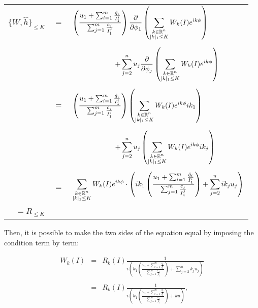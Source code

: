 \begin{longtable}{rcl}
$\{W,\hat{h}\}_{\leq K}$ & $=$ & $\displaystyle
 \left(\frac{u_1 + \sum_{i = 1}^{m}\frac{\hat{q}_i}{I_1^i}}{\sum_{j = 1}^m \frac{c_j}{I_1^j}}\right)\frac{\partial }{\partial \phi_1}\left(\sum_{\begin{subarray}{c} k\in\mathbb{R}^n \\ |k|_1 \leq K\end{subarray}}W_k(I)e^{ik\phi}\right)$\\
 \\
& & $\qquad \qquad \qquad  + \displaystyle\sum_{j = 2}^n u_j \frac{\partial }{\partial \phi_j}\left(\sum_{\begin{subarray}{c} k\in\mathbb{R}^n \\ |k|_1 \leq K\end{subarray}}W_k(I)e^{ik\phi}\right)$\\
\\
& $=$ & $\displaystyle\left(\frac{u_1 + \sum_{i = 1}^{m}\frac{\hat{q}_i}{I_1^i}}{\sum_{j = 1}^m \frac{c_j}{I_1^j}}\right)\left(\sum_{\begin{subarray}{c} k\in\mathbb{R}^n \\ |k|_1 \leq K\end{subarray}}W_k(I)e^{ik\phi}ik_1\right)$\\
\\
& &  $\qquad \qquad \qquad + \displaystyle\sum_{j = 2}^n u_j \left(\sum_{\begin{subarray}{c} k\in\mathbb{R}^n \\ |k|_1 \leq K\end{subarray}}W_k(I)e^{ik\phi}ik_j\right)$
\\
\\
& = & $\displaystyle \sum_{\begin{subarray}{c} k\in\mathbb{R}^n \\ |k|_1 \leq K\end{subarray}} W_k(I)e^{ik\phi}\cdot\left( i k_1 \left(\frac{u_1 + \sum_{i = 1}^{m}\frac{\hat{q}_i}{I_1^i}}{\sum_{j = 1}^m \frac{c_j}{I_1^j}}\right)
+ \sum_{j=2}^nik_ju_j\right)$\\
\\
$ = R_{\leq K}$\\
\end{longtable}
Then, it is possible to make the two sides of the equation equal by imposing the condition term by term:

\begin{equation}\label{eq:solve_coefs}
\begin{array}{rcl}
W_k(I) & = & \displaystyle R_k(I)\frac{1}{i\left(k_1 \left(\frac{u_1 + \sum_{i = 1}^{m}\frac{\hat{q}_i}{I_1^i}}{\sum_{j = 1}^m \frac{c_j}{I_1^j}}\right)  + \sum_{j = 2}^n k_ju_j\right)}
\\
\\
& = & \displaystyle R_k(I)\frac{1}{i\left(k_1 \left(\frac{u_1 + \sum_{i = 1}^{m}\frac{\hat{q}_i}{I_1^i}}{\sum_{j = 1}^m \frac{c_j}{I_1^j}}\right) + \bar{k}\bar{u}\right)},
\end{array}
\end{equation}

